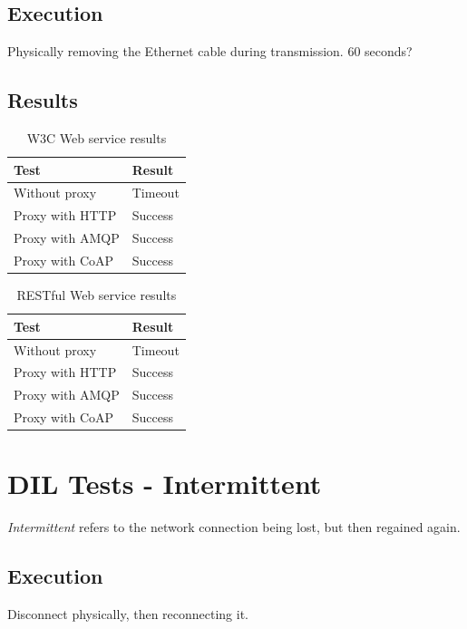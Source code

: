 \subsection{Execution}

Physically removing the Ethernet cable during transmission. 60 seconds?

\subsection{Results}

\begin{table}[h!]
\begin{tabular}{| l | l |}
\hline
  \textbf{Test} & \textbf{Result} \\ \hline
  Without proxy & Timeout \\ \hline
  Proxy with HTTP & Success \\ \hline
  Proxy with AMQP & Success \\ \hline
  Proxy with CoAP & Success \\ \hline
\end{tabular}
\caption{W3C Web service results}
\end{table}

\begin{table}[h!]
\begin{tabular}{| l | l |}
\hline
  \textbf{Test} & \textbf{Result} \\ \hline
  Without proxy & Timeout \\ \hline
  Proxy with HTTP & Success \\ \hline
  Proxy with AMQP & Success \\ \hline
  Proxy with CoAP & Success \\ \hline
\end{tabular}
\caption{RESTful Web service results}
\end{table}

\section{DIL Tests - Intermittent}

\textit{Intermittent} refers to the network connection being lost, but then regained again.

\subsection{Execution}

Disconnect physically, then reconnecting it.

